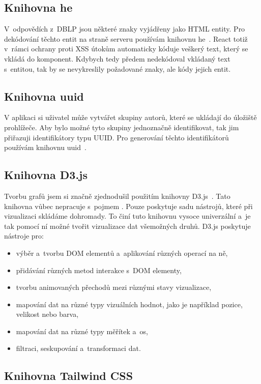 \documentclass[
  biblatex,
  sourcecodes,
  glossaries,
  index
]{kidiplom}
\begin{document}
\subsection{Knihovna he}

V~odpovědích z~DBLP jsou některé znaky vyjádřeny jako HTML entity. Pro dekódování těchto entit na straně serveru používám knihovnu he~\cite{t22}. React totiž v~rámci ochrany proti XSS útokům automaticky kóduje veškerý text, který se vkládá do komponent. Kdybych tedy předem nedekódoval vkládaný text s~entitou, tak by se nevykreslily požadované znaky, ale kódy jejich entit.

\subsection{Knihovna uuid}

V aplikaci si uživatel může vytvářet skupiny autorů, které se ukládají do úložiště prohlížeče. Aby bylo možné tyto skupiny jednoznačně identifikovat, tak jim přiřazuji identifikátory typu UUID. Pro generování těchto identifikátorů používám knihovnu uuid~\cite{t23}.

\subsection{Knihovna D3.js}

Tvorbu grafů jsem si značně zjednodušil použitím knihovny D3.js~\cite{t24}. Tato knihovna vůbec nepracuje s~pojmem . Pouze poskytuje sadu nástrojů, které při vizualizaci skládáme dohromady. To činí tuto knihovnu vysoce univerzální a~je tak pomocí ní možné tvořit vizualizace dat všemožných druhů. D3.js poskytuje nástroje pro:
\begin{itemize}
\item výběr a~tvorbu DOM elementů a~aplikování různých operací na ně,
\item přidávání různých metod interakce s~DOM elementy,
\item tvorbu animovaných přechodů mezi různými stavy vizualizace,
\item mapování dat na různé typy vizuálních hodnot, jako je například pozice, velikost nebo barva,
\item mapování dat na různé typy měřítek a~os,
\item filtraci, seskupování a~transformaci dat.
\end{itemize}

\subsection{Knihovna Tailwind CSS}
\end{document}
